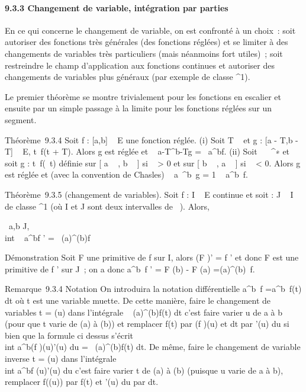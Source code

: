 \paragraph{9.3.3 Changement de variable, intégration par parties}

En ce qui concerne le changement de variable, on est confronté à un
choix~: soit autoriser des fonctions très générales (des fonctions
réglées) et se limiter à des changements de variables très particuliers
(mais néanmoins fort utiles)~; soit restreindre le champ d'application
aux fonctions continues et autoriser des changements de variables plus
généraux (par exemple de classe ^1).

Le premier théorème se montre trivialement pour les fonctions en
escalier et ensuite par un simple passage à la limite pour les fonctions
réglées sur un segment.

Théorème~9.3.4 Soit f : {[}a,b{]} \rightarrow~ E une fonction réglée. (i) Soit T \in
{}~ et g : {[}a - T,b - T{]} \rightarrow~ E, t\mapsto~f(t + T).
Alors g est réglée et \int ~
a-T^b-Tg =\int ~
a^bf. (ii) Soit \lambda~ \in {}~^∗ et soit g :
t\mapsto~f(\lambda~t) définie sur {[} a
\over \lambda~ , b \over \lambda~ {]} si \lambda~
\textgreater{} 0 et sur {[} b \over \lambda~ , a
\over \lambda~ {]} si \lambda~ \textless{} 0. Alors g est réglée et
(avec la convention de Chasles) \int ~
a\diagup\lambda~^b\diagup\lambda~g = 1 \over \lambda~
\int  a^b~f.

Théorème~9.3.5 (changement de variables). Soit f : I \rightarrow~ E continue et
soit \phi : J \rightarrow~ I de classe ^1 (où I et J sont deux intervalles
de ~). Alors,

\forall~a,b \in J, \\int ~
a^bf \cdot \phi \phi' =\int ~
\phi(a)^\phi(b)f

Démonstration Soit F une primitive de f sur I, alors (F \cdot \phi)' = f \cdot \phi \phi'
et donc F \cdot \phi est une primitive de f \cdot \phi \phi' sur J~; on a donc
\int  a^b~f \cdot \phi \phi' = F \cdot \phi(b) - F
\cdot \phi(a) =\int  \phi(a)^\phi(b)~f.

Remarque~9.3.4 Notation On introduira la notation différentielle
\int  a^b~f
=\int  a^b~f(t) dt où t est une
variable muette. De cette manière, faire le changement de variables t =
\phi(u) dans l'intégrale \int ~
\phi(a)^\phi(b)f(t) dt c'est faire varier u de a à b (pour que
t varie de \phi(a) à \phi(b)) et remplacer f(t) par (f \cdot \phi)(u) et dt par \phi'(u)
du si bien que la formule ci dessus s'écrit \\int
 a^b(f \cdot \phi)(u)\phi'(u) du =\int ~
\phi(a)^\phi(b)f(t) dt. De même, faire le changement de
variable inverse t = \phi(u) dans l'intégrale \\int
 a^bf \cdot \phi(u)\phi'(u) du c'est faire varier t de \phi(a) à
\phi(b) (puisque u varie de a à b), remplacer f(\phi(u)) par f(t) et \phi'(u) du
par dt.

